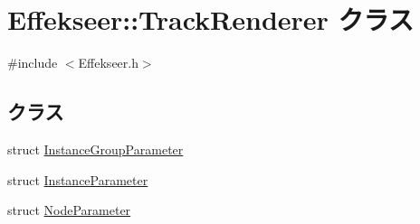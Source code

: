 \hypertarget{class_effekseer_1_1_track_renderer}{}\section{Effekseer\+:\+:Track\+Renderer クラス}
\label{class_effekseer_1_1_track_renderer}


{\ttfamily \#include $<$Effekseer.\+h$>$}

\subsection*{クラス}
\begin{DoxyCompactItemize}
\item 
struct \mbox{\hyperlink{struct_effekseer_1_1_track_renderer_1_1_instance_group_parameter}{Instance\+Group\+Parameter}}
\item 
struct \mbox{\hyperlink{struct_effekseer_1_1_track_renderer_1_1_instance_parameter}{Instance\+Parameter}}
\item 
struct \mbox{\hyperlink{struct_effekseer_1_1_track_renderer_1_1_node_parameter}{Node\+Parameter}}
\end{DoxyCompactItemize}
